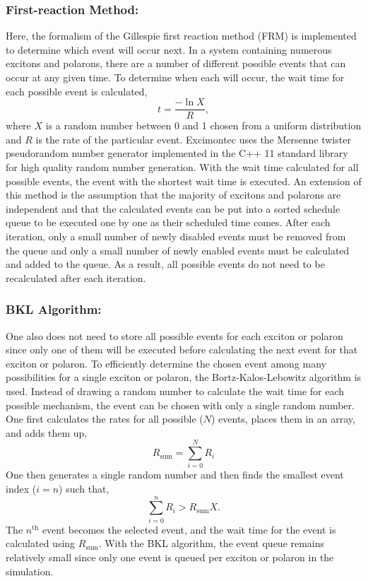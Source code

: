 \documentclass[%
 reprint,onecolumn,notitlepage,
superscriptaddress,longbibliography,
 amsmath,amssymb,
 aps,rmp,floatfix,
]{revtex4-1}
\begin{document}
\subsubsection{First-reaction Method:}

Here, the formalism of the Gillespie first reaction method (FRM) is implemented to determine which event will occur next.\cite{gillespie1976jcp} 
In a system containing numerous excitons and polarons, there are a number of different possible events that can occur at any given time. 
To determine when each will occur, the wait time for each possible event is calculated,
$$t = \frac{-\ln{X}}{R},$$
where $X$ is a random number between 0 and 1 chosen from a uniform distribution and $R$ is the rate of the particular event. 
Excimontec uses the Mersenne twister pseudorandom number generator implemented in the C++ 11 standard library for high quality random number generation.
With the wait time calculated for all possible events, the event with the shortest wait time is executed. 
An extension of this method is the assumption that the majority of excitons and polarons are independent and that the calculated events can be put into a sorted schedule queue to be executed one by one as their scheduled time comes. 
After each iteration, only a small number of newly disabled events must be removed from the queue and only a small number of newly enabled events must be calculated and added to the queue. 
As a result, all possible events do not need to be recalculated after each iteration.

\subsubsection{BKL Algorithm:}

One also does not need to store all possible events for each exciton or polaron since only one of them will be executed before calculating the next event for that exciton or polaron. 
To efficiently determine the chosen event among many possibilities for a single exciton or polaron, the Bortz-Kalos-Lebowitz algorithm is used.\cite{bortz1974prb}
Instead of drawing a random number to calculate the wait time for each possible mechanism, the event can be chosen with only a single random number. 
One first calculates the rates for all possible ($N$) events, places them in an array, and adds them up,
$$R_\text{sum} = \sum_{i=0}^N R_i$$
One then generates a single random number and then finds the smallest event index ($i=n$) such that,
$$\sum_{i=0}^n R_i > R_\text{sum}X.$$
The $n^\text{th}$ event becomes the selected event, and the wait time for the event is calculated using $R_\text{sum}$. 
With the BKL algorithm, the event queue remains relatively small since only one event is queued per exciton or polaron in the simulation.
\end{document}
